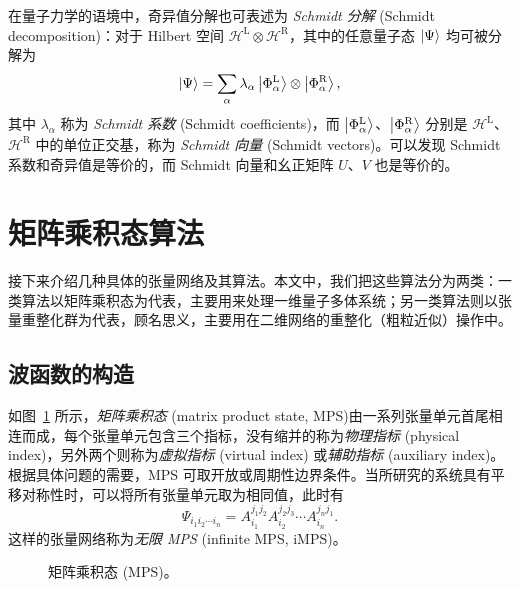在量子力学的语境中，奇异值分解也可表述为 \emph{Schmidt 分解} (Schmidt decomposition)：对于 Hilbert 空间 $\mathcal{H}^{\text{L}}\otimes\mathcal{H}^{\text{R}}$，其中的任意量子态 $\ket{\Psi}$ 均可被分解为
\begin{equation}
  \ket{\Psi} = \sum_\alpha \lambda_\alpha \ket{\Phi^{\text{L}}_\alpha} \otimes \ket{\Phi^{\text{R}}_\alpha},
  \label{eq:schmidt-decomposition}
\end{equation}
其中 $\lambda_\alpha$ 称为 \emph{Schmidt 系数} (Schmidt coefficients)，而 $\ket{\Phi^{\text{L}}_\alpha}$、$\ket{\Phi^{\text{R}}_\alpha}$ 分别是 $\mathcal{H}^{\text{L}}$、$\mathcal{H}^{\text{R}}$ 中的单位正交基，称为 \emph{Schmidt 向量} (Schmidt vectors)。可以发现 Schmidt 系数和奇异值是等价的，而 Schmidt 向量和幺正矩阵 $U$、$V$ 也是等价的。

\section{矩阵乘积态算法}

接下来介绍几种具体的张量网络及其算法。本文中，我们把这些算法分为两类：一类算法以矩阵乘积态为代表，主要用来处理一维量子多体系统；另一类算法则以张量重整化群为代表，顾名思义，主要用在二维网络的重整化（粗粒近似）操作中。

\subsection{波函数的构造}
\label{subsec:mps-construction}

如图~\ref{fig:mps} 所示，\emph{矩阵乘积态} (matrix product state, MPS)\cite{perez2007matrix,verstraete2008matrix,orus2014practical,cirac2021matrix}由一系列张量单元首尾相连而成，每个张量单元包含三个指标，没有缩并的称为\emph{物理指标} (physical index)，另外两个则称为\emph{虚拟指标} (virtual index) 或\emph{辅助指标} (auxiliary index)。根据具体问题的需要，MPS 可取开放或周期性边界条件。当所研究的系统具有平移对称性时，可以将所有张量单元取为相同值，此时有
\begin{equation}
  \Psi_{i_1 i_2 \cdots i_n} = A^{j_1 j_2}_{i_1} A^{j_2 j_3}_{i_2} \cdots A^{j_n j_1}_{i_n}.
\end{equation}
这样的张量网络称为\emph{无限 MPS} (infinite MPS, iMPS)。

\begin{figure}[htb]
  \centering
   \qquad
  \caption[矩阵乘积态]{矩阵乘积态 (MPS)。}
  \label{fig:mps}
\end{figure}

